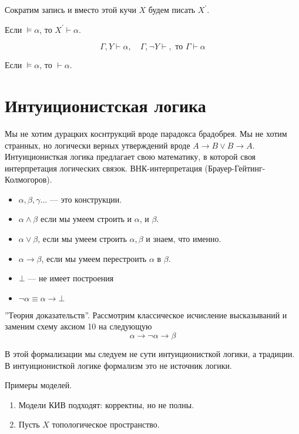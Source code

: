 Сократим запись и вместо этой кучи $X$ будем писать $X^\prime$.
\begin{lemma}
    Если $\vDash \alpha$, то $X^\prime \vdash \alpha$.
\end{lemma}

\begin{lemma}
    \[ \Gamma, Y \vdash \alpha, \quad \Gamma, \neg Y \vdash, \text{ то } \Gamma \vdash \alpha \]
\end{lemma}

\begin{theorem}
    Если $\vDash \alpha$, то $\vdash \alpha$.
\end{theorem}

\section{Интуиционистская логика}
Мы не хотим дурацких коснтрукций вроде парадокса брадобрея.
Мы не хотим странных, но логически верных утверждений вроде $A\to B \lor B \to A$.
Интуиционисткая логика предлагает свою математику, в которой своя интерпретация логических связок.
ВНК-интерпретация (Брауер-Гейтинг-Колмогоров).

\begin{itemize}\itemsep=-1mm
    \item $\alpha, \beta, \gamma \ldots$ --- это конструкции.
    \item $\alpha \land \beta$ если мы умеем строить и $\alpha$, и $\beta$.
    \item $\alpha \lor \beta$, если мы умеем строить $\alpha, \beta$ и знаем, что именно.
    \item $\alpha \to \beta$, если мы умеем перестроить $\alpha$ в $\beta$.
    \item $\bot $ --- не имеет построения
    \item $\neg \alpha \equiv \alpha \to \bot$   
\end{itemize}

''Теория доказательств''.
Рассмотрим классическое исчисление высказываний и заменим схему аксиом 10 на следующую 
\[ \alpha \to \neg \alpha \to \beta \] 

В этой формализации мы следуем не сути интуиционисткой логики, а традиции.
В интуиционисткой логике формализм это не источник логики.

Примеры моделей.
\begin{enumerate}
    \item Модели КИВ подходят: корректны, но не полны.
    \item Пусть $X$ топологическое пространство.
\end{enumerate}


\endinput